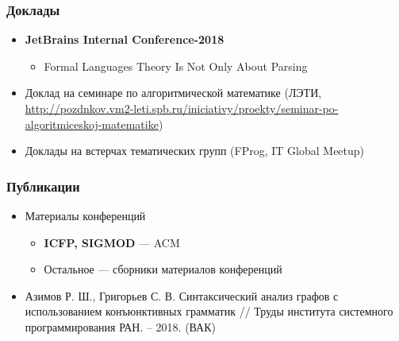 \documentclass[xcolor=table]{beamer}
\begin{document}
\begin{frame}[fragile]
  \transwipe[direction=90]
  \frametitle{Доклады}
\begin{itemize}

      \item \textbf{JetBrains Internal Conference-2018}
      \begin{itemize}
        \item Formal Languages Theory Is Not Only About Parsing
      \end{itemize}

      \item Доклад на семинаре по алгоритмической математике (ЛЭТИ, \url{http://pozdnkov.vm2-leti.spb.ru/iniciativy/proekty/seminar-po-algoritmiceskoj-matematike})

      \item Доклады на встерчах тематических групп (FProg, IT Global Meetup)

\end{itemize}
\end{frame}


\begin{frame}[fragile]
  \transwipe[direction=90]
  \frametitle{Публикации}
\begin{itemize}
      \item Материалы конференций
        \begin{itemize}
          \item \textbf{ICFP, SIGMOD} --- ACM
          \item Остальное --- сборники материалов конференций
        \end{itemize}
      \item Азимов Р. Ш., Григорьев С. В. Синтаксический анализ графов с использованием конъюнктивных грамматик // Труды института системного программирования РАН. – 2018. (ВАК)
\end{itemize}
\end{frame}
\end{document}
